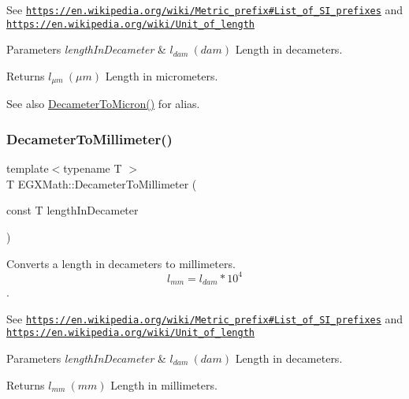 See \href{https://en.wikipedia.org/wiki/Metric_prefix#List_of_SI_prefixes}{\tt https\+://en.\+wikipedia.\+org/wiki/\+Metric\+\_\+prefix\#\+List\+\_\+of\+\_\+\+S\+I\+\_\+prefixes} and \href{https://en.wikipedia.org/wiki/Unit_of_length}{\tt https\+://en.\+wikipedia.\+org/wiki/\+Unit\+\_\+of\+\_\+length} 
\begin{DoxyParams}{Parameters}
{\em length\+In\+Decameter} & $ l_{dam}\ (dam)$ Length in decameters. \\
\hline
\end{DoxyParams}
\begin{DoxyReturn}{Returns}
$ l_{\mu m}\ (\mu m)$ Length in micrometers. 
\end{DoxyReturn}
\begin{DoxySeeAlso}{See also}
\mbox{\hyperlink{group___e_g_x_math-_conversions-_length_conversions-_decameter-_non-_s_i_gaf3c7befd051b823dc17aca5318cae689}{Decameter\+To\+Micron()}} for alias. 
\end{DoxySeeAlso}
\mbox{\label{group___e_g_x_math-_conversions-_length_conversions-_decameter-_s_i_gaa1ebc69084f0d429e62a6af0ef509bb7}} 
\subsubsection{\texorpdfstring{Decameter\+To\+Millimeter()}{DecameterToMillimeter()}}
{\footnotesize\ttfamily template$<$typename T $>$ \\
T E\+G\+X\+Math\+::\+Decameter\+To\+Millimeter (\begin{DoxyParamCaption}\item[{const T}]{length\+In\+Decameter }\end{DoxyParamCaption})}



Converts a length in decameters to millimeters. \[ l_{mm}=l_{dam} * 10^{4} \]. 

See \href{https://en.wikipedia.org/wiki/Metric_prefix#List_of_SI_prefixes}{\tt https\+://en.\+wikipedia.\+org/wiki/\+Metric\+\_\+prefix\#\+List\+\_\+of\+\_\+\+S\+I\+\_\+prefixes} and \href{https://en.wikipedia.org/wiki/Unit_of_length}{\tt https\+://en.\+wikipedia.\+org/wiki/\+Unit\+\_\+of\+\_\+length} 
\begin{DoxyParams}{Parameters}
{\em length\+In\+Decameter} & $ l_{dam}\ (dam)$ Length in decameters. \\
\hline
\end{DoxyParams}
\begin{DoxyReturn}{Returns}
$ l_{mm}\ (mm)$ Length in millimeters. 
\end{DoxyReturn}
\mbox{\label{group___e_g_x_math-_conversions-_length_conversions-_decameter-_s_i_gad2173f361037d8cfbdcc6b99c79a9105}} 
